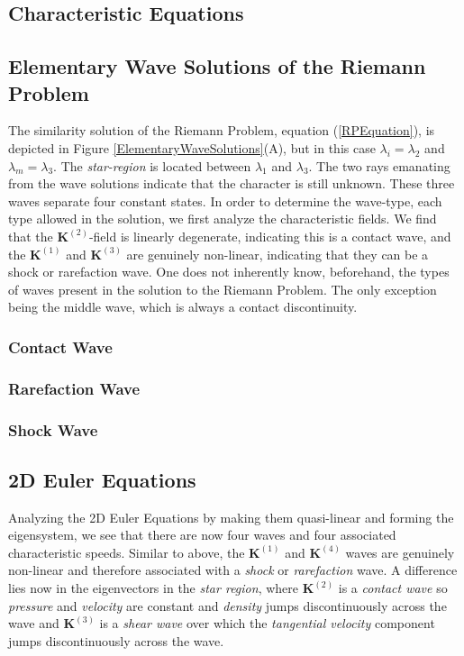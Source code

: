 \documentclass[]{article}
\begin{document}
		
	\subsection{Characteristic Equations}
		
	\subsection{Elementary Wave Solutions of the Riemann Problem}
		
		The similarity solution of the Riemann Problem, equation (\ref{RPEquation}), is depicted in Figure \ref{ElementaryWaveSolutions}(A), but in this case $ \lambda_i = \lambda_2$ and $ \lambda_m = \lambda_3$. The \textit{star-region} is located between $ \lambda_1 $ and $ \lambda_3 $. The two rays emanating from the wave solutions indicate that the character is still unknown. These three waves separate four constant states. In order to determine the wave-type, each type allowed in the solution, we first analyze the characteristic fields. We find that the $ \textbf{K}^{(2)} $-field is linearly degenerate, indicating this is a contact wave, and the $ \textbf{K}^{(1)} $ and $ \textbf{K}^{(3)} $ are genuinely non-linear, indicating that they can be a shock or rarefaction wave. One does not inherently know, beforehand, the types of waves present in the solution to the Riemann Problem. The only exception being the middle wave, which is always a contact discontinuity.
		
		\subsubsection{Contact Wave}
		\subsubsection{Rarefaction Wave}	
		\subsubsection{Shock Wave}
			
			
		\subsection{2D Euler Equations}
			Analyzing the 2D Euler Equations by making them quasi-linear and forming the eigensystem, we see that there are now four waves and four associated characteristic speeds. Similar to above, the $ \textbf{K}^{(1)} $ and $ \textbf{K}^{(4)} $ waves are genuinely non-linear and therefore associated with a \textit{shock} or \textit{rarefaction} wave. A difference lies now in the eigenvectors in the \textit{star region}, where $ \textbf{K}^{(2)} $ is a \textit{contact wave} so \textit{pressure} and \textit{velocity} are constant and \textit{density} jumps discontinuously across the wave and $ \textbf{K}^{(3)} $ is a \textit{shear wave} over which the \textit{tangential velocity} component jumps discontinuously across the wave.	
		
\end{document}
